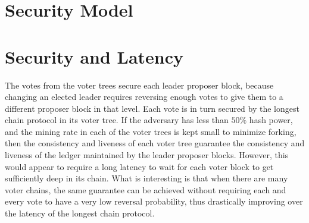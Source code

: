 \section{Security Model}

\fi

\section{Security and Latency}
\label{sec:prism-latency}


The votes from the voter trees secure each leader proposer block, because changing an elected leader requires reversing enough votes to give them to a different proposer block in that level. 
Each vote is in turn secured by the longest chain protocol in its voter tree. If the adversary has less than $50\%$ hash power, and the mining rate in each of the voter trees is kept small to minimize forking,  then the consistency and liveness of each voter tree guarantee the consistency and liveness of the ledger maintained by the leader proposer blocks. 
However, this would appear to require a long latency to wait for each voter block to get sufficiently deep in its chain. What is interesting is that when there are many voter chains, the same guarantee can be achieved without requiring each and every vote to have a very low reversal probability, thus drastically improving over the latency of the longest chain protocol. 


